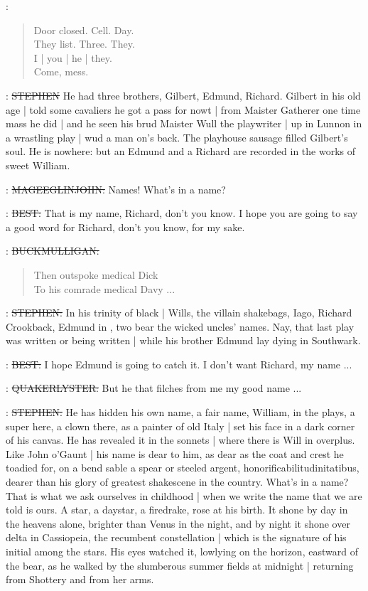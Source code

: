 \StephenInt:
\begin{verse}
    Door closed. Cell. Day.\\
    They list. Three. They.
 \\
    I | you | he | they.\\
    Come, mess.
\end{verse}

\Stephen:  \sout{STEPHEN}
He had three brothers,
Gilbert,
Edmund,
Richard.
Gilbert in his old age |
told some cavaliers he got a pass for nowt |
from Maister Gatherer one time mass he did |
and he seen his brud Maister Wull the playwriter |
up in Lunnon in a wrastling play |
wud a man on's back.
The playhouse sausage filled Gilbert's soul.
He is nowhere:
but an Edmund and a Richard are recorded in the works of sweet William.

\eglinton:  \sout{MAGEEGLINJOHN:}
Names!
What's in a name?

\best:
\sout{BEST:}
That is my name,
Richard,
don't you know.
I hope you are going to say a good word for Richard,
don't you know,
for my sake.


\mulligan:
\sout{BUCKMULLIGAN:}
\begin{verse}
         Then outspoke medical Dick \\
         To his comrade medical Davy ...
\end{verse}

\Stephen:
\sout{STEPHEN:}
In his trinity of black |
Wills,
the villain shakebags,
Iago,
Richard Crookback,
Edmund in ,
two bear the wicked uncles' names.
Nay,
that last play was written or being written |
while his brother Edmund lay dying in Southwark.

\best:
\sout{BEST:}
I hope Edmund is going to catch it.
I don't want Richard, my name ...


\librarian:
\sout{QUAKERLYSTER:}
But he that filches from me my good name ...

\Stephen:
\sout{STEPHEN:}
He has hidden his own name,
a fair name,
William,
in the plays,
a super here,
a clown there,
as a painter of old Italy |
set his face in a dark corner of his canvas.
He has revealed it in the sonnets |
where there is Will in overplus.
Like John o'Gaunt |
his name is dear to him,
as dear as the coat and crest he toadied for,
on a bend sable a spear or steeled argent,
honorificabilitudinitatibus,
dearer than his glory of greatest shakescene in the country.
What's in a name?
That is what we ask ourselves in childhood |
when we write the name that we are told is ours.
A star,
a daystar,
a firedrake,
rose at his birth.
It shone by day in the heavens alone,
brighter than Venus in the night,
and by night it shone over delta in Cassiopeia,
the recumbent constellation |
which is the signature of his initial among the stars.
His eyes watched it,
lowlying on the horizon,
eastward of the bear,
as he walked by the slumberous summer fields at midnight |
returning from Shottery and from her arms.

